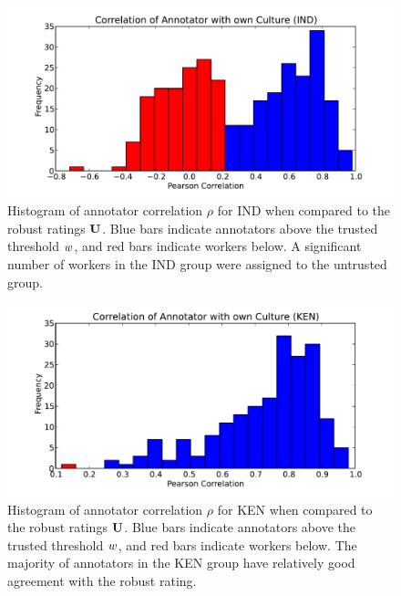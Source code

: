 \begin{figure}
\centering
\includegraphics[width = 0.6 \columnwidth]{annotation/correlind.pdf}
\caption[Histogram of annotator correlation $\rho$ for IND when compared to the robust ratings $\robustAnnotation$.]{Histogram of annotator correlation $\rho$ for IND when compared to the robust ratings $\robustAnnotation$. Blue bars indicate annotators above the trusted threshold $w$, and red bars indicate workers below. A significant number of workers in the IND group were assigned to the untrusted group.}
\label{FigureCorrelationHistOfInd}
\end{figure}

\begin{figure}
\centering
\includegraphics[width = 0.6 \columnwidth]{annotation/correlken.pdf}
\caption[Histogram of annotator correlation $\rho$ for KEN when compared to the robust ratings $\robustAnnotation$.]{Histogram of annotator correlation $\rho$ for KEN when compared to the robust ratings $\robustAnnotation$. Blue bars indicate annotators above the trusted threshold $w$, and red bars indicate workers below. The majority of annotators in the KEN group have relatively good agreement with the robust rating.}
\label{FigureCorrelationHistOfKen}
\end{figure}

